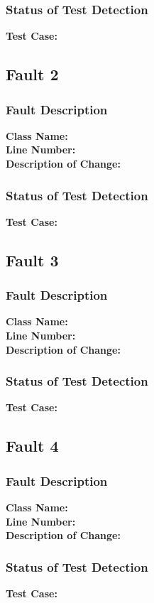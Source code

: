 \documentclass[letterpaper,10pt]{article}
\begin{document}
		\subsubsection{Status of Test Detection}
		\textbf{Test Case: } \\
	\subsection{Fault 2}
		\subsubsection{Fault Description}
		\textbf{Class Name: } \\
		\textbf{Line Number: } \\
		\textbf{Description of Change: } \\
		\subsubsection{Status of Test Detection}
		\textbf{Test Case: } \\
	\subsection{Fault 3}
		\subsubsection{Fault Description}
		\textbf{Class Name: } \\
		\textbf{Line Number: } \\
		\textbf{Description of Change: } \\
		\subsubsection{Status of Test Detection}
		\textbf{Test Case: } \\
	\subsection{Fault 4}
		\subsubsection{Fault Description}
		\textbf{Class Name: } \\
		\textbf{Line Number: } \\
		\textbf{Description of Change: } \\
		\subsubsection{Status of Test Detection}
		\textbf{Test Case: } \\
\end{document}
